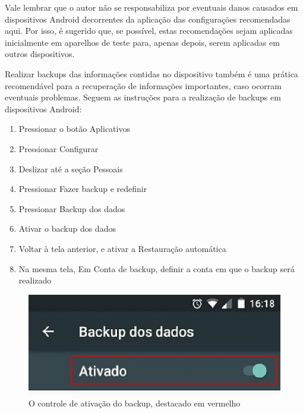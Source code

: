 Vale lembrar que o autor n\~ao se responsabiliza por eventuais danos causados em dispositivos Android decorrentes da aplica\c c\~ao das configura\c c\~oes recomendadas aqui. Por isso, \'e sugerido que, se poss\'ivel, estas recomenda\c c\~oes sejam aplicadas inicialmente em aparelhos de teste para, apenas depois, serem aplicadas em outros dispositivos. 

Realizar backups das informa\c c\~oes contidas no dispositivo tamb\'em \'e uma pr\'atica recomend\'avel para a recupera\c c\~ao de informa\c c\~oes importantes, caso ocorram eventuais problemas. Seguem as instru\c c\~oes para a realiza\c c\~ao de backups em dispositivos Android:

\begin{enumerate}
\item Pressionar o bot\~ao Aplicativos
\item Pressionar Configurar
\item Deslizar at\'e a se\c c\~ao Pessoais
\item Pressionar Fazer backup e redefinir
\item Pressionar Backup dos dados 
\item Ativar o backup dos dados
\item Voltar \`a tela anterior, e ativar a Restaura\c c\~ao autom\'atica
\item Na mesma tela, Em Conta de backup, definir a conta em que o backup ser\'a realizado   
\end{enumerate}

\begin{figure}[h]
	\centering
	\includegraphics{imagem3.eps}
	\caption{O controle de ativa\c c\~ao do backup, destacado em vermelho}
\end{figure}

